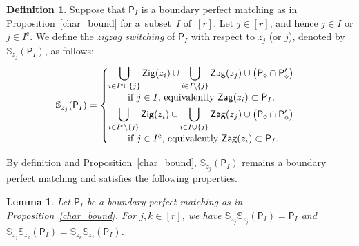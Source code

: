 \documentclass[10pt,a4paper]{amsart}
\numberwithin{equation}{section}
\newtheorem{Lemma}[Theorem]{Lemma}
\theoremstyle{definition}
\newtheorem{Definition}[Theorem]{Definition}
\newcommand{\BS}{\mathbb{S}}
\newcommand{\rmc}{\mathrm{c}}
\newcommand{\sfP}{\mathsf{P}}
\newcommand{\Zig}{\mathsf{Zig}}
\newcommand{\Zag}{\mathsf{Zag}}
\newcommand{\cPM}{\sfP_\diamond}
\begin{document}
\begin{Definition}
\label{def_switching}
Suppose that $\sfP_I$ is a boundary perfect matching as in Proposition~\ref{char_bound} for a~subset~$I$ of~$[r]$.
Let $j\in [r]$, and hence $j\in I$ or $j\in I^\rmc$.
We define the \emph{zigzag switching} of $\sfP_I$ with respect to $z_j$ (or $j$), denoted by $\BS_{z_j}(\sfP_I)$, as follows:
\begin{gather*}
\BS_{z_j}(\sfP_I)=
\begin{cases}
\displaystyle\bigcup_{i\in I^\rmc\cup\{j\}}\Zig(z_i)\cup\bigcup_{i\in I{\setminus}\{j\}}\Zag(z_j)\cup\big(\cPM\cap\cPM^\prime\big)
\\
\qquad \text{if $j\in I$, equivalently $\Zag(z_i)\subset\sfP_I$}, \vspace{1mm} \\
\displaystyle\bigcup_{i\in I^\rmc{\setminus}\{j\}}\Zig(z_i)\cup\bigcup_{i\in I\cup\{j\}}\Zag(z_j)\cup\big(\cPM\cap\cPM^\prime\big)
\\
\qquad \text{if $j\in I^\rmc$, equivalently $\Zag(z_i)\subset\sfP_I$}.
\end{cases}
\end{gather*}
\end{Definition}

By definition and Proposition~\ref{char_bound}, $\BS_{z_j}(\sfP_I)$ remains a boundary perfect matching and satisfies the following properties.

\begin{Lemma}
Let $\sfP_I$ be a boundary perfect matching as in Proposition~{\rm \ref{char_bound}}.
For $j, k\in [r]$, we have $\BS_{z_j}\BS_{z_j}(\sfP_I)=\sfP_I$ and $\BS_{z_j}\BS_{z_k}(\sfP_I)=\BS_{z_k}\BS_{z_j}(\sfP_I)$.
\end{Lemma}
\end{document}
